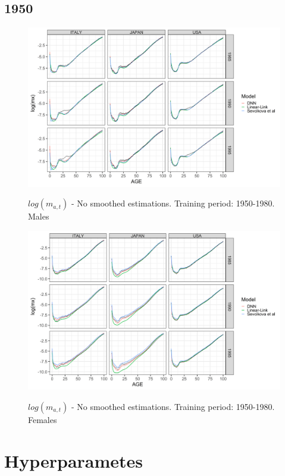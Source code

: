 \documentclass[a4,11pt]{article}
\begin{document}
\subsection{1950}
\begin{figure}[H]
	\centering
	\includegraphics[width=1\linewidth]{NO_S_age_pattern_M_1950}\\
	\caption{$log(m_{a,t})$ - No smoothed estimations. Training period: 1950-1980. Males} 
\end{figure}

\begin{figure}[H]
	\centering
	\includegraphics[width=1\linewidth]{NO_S_age_pattern_F_1950}\\
	\caption{$log(m_{a,t})$ - No smoothed estimations. Training period: 1950-1980. Females} 
\end{figure}


\section{Hyperparametes}
\end{document}
